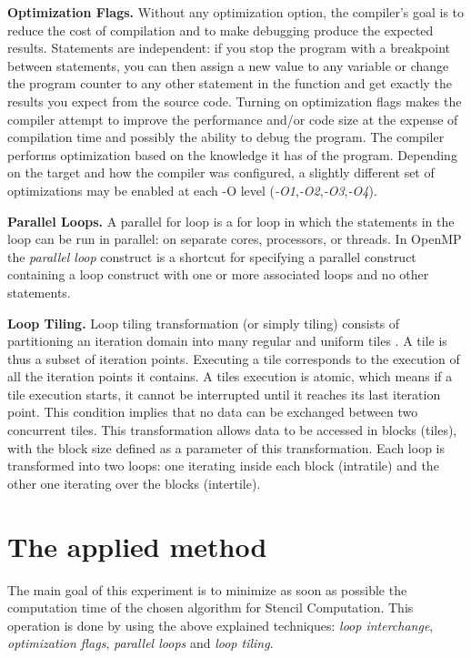\documentclass[conference]{IEEEtran}
\newcommand{\mypar}[1]{{\bf #1.}}
\begin{document}
\mypar{Optimization Flags}
Without any optimization option, the compiler's goal is to reduce the cost of compilation and to make debugging produce the expected results. Statements are independent: if you stop the program with a breakpoint between statements, you can then assign a new value to any variable or change the program counter to any other statement in the function and get exactly the results you expect from the source code. 
Turning on optimization flags makes the compiler attempt to improve the performance and/or code size at the expense of compilation time and possibly the ability to debug the program. 
The compiler performs optimization based on the knowledge it has of the program. 
Depending on the target and how the compiler was configured, a slightly different set of optimizations may be enabled at each -O level (\textit{-O1},\textit{-O2},\textit{-O3},\textit{-O4}).\cite{optimization-flags}

\mypar{Parallel Loops}
A parallel for loop is a for loop in which the statements in the loop can be run in parallel: on separate cores, processors, or threads. 
In OpenMP the \textit{parallel loop} construct is a shortcut for specifying a parallel construct containing a loop construct with one or more associated loops and no other statements. \cite{parallel-loops}

\mypar{Loop Tiling}
Loop tiling transformation (or simply tiling) consists of partitioning an iteration domain into many regular and uniform tiles \cite{barigou}. A tile is thus a subset of iteration points. Executing a tile corresponds to the execution of all the iteration points it contains. A tiles execution is atomic, which means if a tile execution starts, it cannot be interrupted until it reaches its last iteration point. This condition implies that no data can be exchanged between two concurrent tiles. This transformation allows data to be accessed in blocks (tiles), with the block size defined as a parameter of this transformation. Each loop is transformed into two loops: one iterating inside each block (intratile) and the other one iterating over the blocks (intertile). \cite{loop-tiling}

\section{The applied method}\label{sec:yourmethod}

The main goal of this experiment is to minimize as soon as possible the computation time of the chosen algorithm for Stencil Computation. This operation is done by using the above explained techniques: \textit{loop interchange}, \textit{optimization flags}, \textit{parallel loops} and \textit{loop tiling}.
\end{document}
